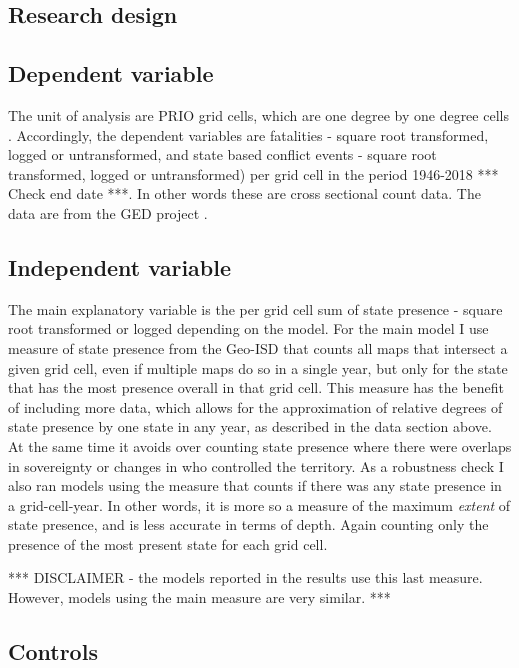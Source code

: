 \documentclass[12pt]{article}
\begin{document}
\begin{multicols}{2}

\section{Research design}

\subsection{Dependent variable}

The unit of analysis are PRIO grid cells, which are one degree by one degree
cells \citep{Tollefsen2012}. Accordingly, the dependent variables are fatalities
- square root transformed, logged or untransformed, and state based conflict
events - square root transformed, logged or untransformed) per grid cell in the
period 1946-2018 *** Check end date ***. In other words these are cross
sectional count data. The data are from the GED project \citep{Sundberg2013}.

\subsection{Independent variable}

The main explanatory variable is the per grid cell sum of state presence -
square root transformed or logged depending on the model. For the main model I
use measure of state presence from the Geo-ISD that counts all maps that
intersect a given grid cell, even if multiple maps do so in a single year, but
only for the state that has the most presence overall in that grid cell. This
measure has the benefit of including more data, which allows for the
approximation of relative degrees of state presence by one state in any year, as
described in the data section above. At the same time it avoids over counting
state presence where there were overlaps in sovereignty or changes in who
controlled the territory. As a robustness check I also ran models using the
measure that counts if there was any state presence in a grid-cell-year. In
other words, it is more so a measure of the maximum \textit{extent} of state
presence, and is less accurate in terms of depth. Again counting only the
presence of the most present state for each grid cell.

*** DISCLAIMER - the models reported in the results use this last measure.
However, models using the main measure are very similar. *** 

\subsection{Controls}


\end{multicols}
\end{document}
